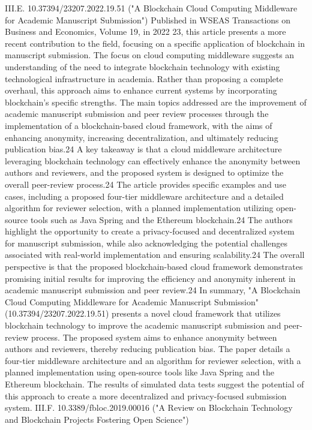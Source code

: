 \documentclass{article}
\begin{document}
III.E. 10.37394/23207.2022.19.51 ("A Blockchain Cloud Computing Middleware for Academic Manuscript Submission")
Published in WSEAS Transactions on Business and Economics, Volume 19, in 2022 23, this article presents a more recent contribution to the field, focusing on a specific application of blockchain in manuscript submission. The focus on cloud computing middleware suggests an understanding of the need to integrate blockchain technology with existing technological infrastructure in academia. Rather than proposing a complete overhaul, this approach aims to enhance current systems by incorporating blockchain's specific strengths. The main topics addressed are the improvement of academic manuscript submission and peer review processes through the implementation of a blockchain-based cloud framework, with the aims of enhancing anonymity, increasing decentralization, and ultimately reducing publication bias.24 A key takeaway is that a cloud middleware architecture leveraging blockchain technology can effectively enhance the anonymity between authors and reviewers, and the proposed system is designed to optimize the overall peer-review process.24 The article provides specific examples and use cases, including a proposed four-tier middleware architecture and a detailed algorithm for reviewer selection, with a planned implementation utilizing open-source tools such as Java Spring and the Ethereum blockchain.24 The authors highlight the opportunity to create a privacy-focused and decentralized system for manuscript submission, while also acknowledging the potential challenges associated with real-world implementation and ensuring scalability.24 The overall perspective is that the proposed blockchain-based cloud framework demonstrates promising initial results for improving the efficiency and anonymity inherent in academic manuscript submission and peer review.24
In summary, "A Blockchain Cloud Computing Middleware for Academic Manuscript Submission" (10.37394/23207.2022.19.51) presents a novel cloud framework that utilizes blockchain technology to improve the academic manuscript submission and peer-review process. The proposed system aims to enhance anonymity between authors and reviewers, thereby reducing publication bias. The paper details a four-tier middleware architecture and an algorithm for reviewer selection, with a planned implementation using open-source tools like Java Spring and the Ethereum blockchain. The results of simulated data tests suggest the potential of this approach to create a more decentralized and privacy-focused submission system.
III.F. 10.3389/fbloc.2019.00016 ("A Review on Blockchain Technology and Blockchain Projects Fostering Open Science")
\end{document}
